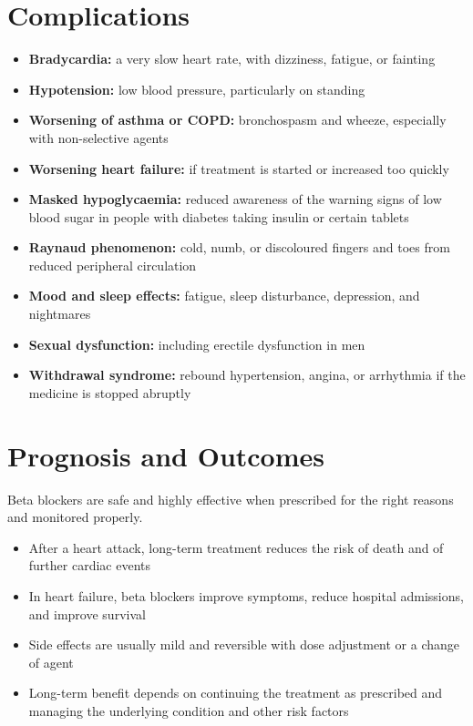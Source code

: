 \section*{Complications}
\begin{itemize}
    \item \textbf{Bradycardia:} a very slow heart rate, with dizziness, fatigue, or fainting
    \item \textbf{Hypotension:} low blood pressure, particularly on standing
    \item \textbf{Worsening of asthma or COPD:} bronchospasm and wheeze, especially with non-selective agents
    \item \textbf{Worsening heart failure:} if treatment is started or increased too quickly
    \item \textbf{Masked hypoglycaemia:} reduced awareness of the warning signs of low blood sugar in people with diabetes taking insulin or certain tablets
    \item \textbf{Raynaud phenomenon:} cold, numb, or discoloured fingers and toes from reduced peripheral circulation
    \item \textbf{Mood and sleep effects:} fatigue, sleep disturbance, depression, and nightmares
    \item \textbf{Sexual dysfunction:} including erectile dysfunction in men
    \item \textbf{Withdrawal syndrome:} rebound hypertension, angina, or arrhythmia if the medicine is stopped abruptly
\end{itemize}

\section*{Prognosis and Outcomes}
Beta blockers are safe and highly effective when prescribed for the right reasons and monitored properly.

\begin{itemize}
    \item After a heart attack, long-term treatment reduces the risk of death and of further cardiac events
    \item In heart failure, beta blockers improve symptoms, reduce hospital admissions, and improve survival
    \item Side effects are usually mild and reversible with dose adjustment or a change of agent
    \item Long-term benefit depends on continuing the treatment as prescribed and managing the underlying condition and other risk factors
\end{itemize}

